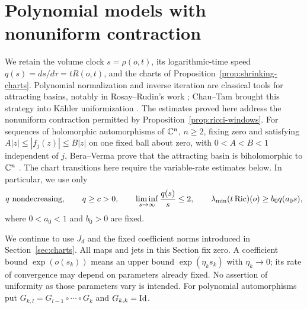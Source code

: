 \section{Polynomial models with nonuniform contraction}
\label{sec:dynamics}

We retain the volume clock $s=\rho(o,t)$, its logarithmic-time speed
$q(s)=ds/d\tau=tR(o,t)$, and the charts of
Proposition~\ref{prop:shrinking-charts}.
Polynomial normalization and inverse iteration are classical tools
for attracting basins, notably in Rosay--Rudin's work
\cite[Appendix]{RosayRudin1988}; Chau--Tam brought this strategy into
K\"ahler uniformization \cite{ChauTamComplex2006,ChauTamStein,ChauTamSimply}.
The estimates proved here address the nonuniform contraction permitted
by Proposition~\ref{prop:ricci-windows}.  For sequences of holomorphic
automorphisms of $\mathbb C^n$, $n\ge2$, fixing zero and satisfying
$A|z|\le|f_j(z)|\le B|z|$ on one fixed ball about zero, with
$0<A<B<1$ independent of $j$, Bera--Verma prove that the attracting
basin is biholomorphic to $\mathbb C^n$ \cite[Theorem~1.1]{BeraVerma2024}.
The chart transitions here require the variable-rate estimates below.
In particular, we use only
\begin{equation}
 q\text{ nondecreasing},\qquad q\ge c>0,\qquad
 \liminf_{s\to\infty}\frac{q(s)}s\le2,\qquad
 \lambda_{\min}(t\operatorname{Ric})(o)\ge b_0q(a_0s),
 \label{eq:dyn:rate-input}
\end{equation}
where $0<a_0<1$ and $b_0>0$ are fixed.

We continue to use $J_d$ and the fixed coefficient norms introduced in
Section~\ref{sec:charts}.
All maps and jets in this Section fix zero.  A coefficient bound
$\exp(o(s_k))$ means an upper bound $\exp(\eta_k s_k)$ with
$\eta_k\to0$; its rate of convergence may depend on parameters already
fixed.  No assertion of uniformity as those parameters vary is intended.
For polynomial automorphisms put
$G_{k,l}=G_{l-1}\circ\cdots\circ G_k$ and $G_{k,k}=\operatorname{Id}$.

